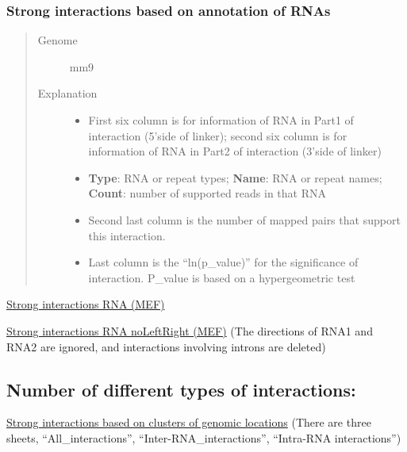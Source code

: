 \documentclass[letterpaper,10pt,english]{sphinxmanual}
\begin{document}
\subsubsection{Strong interactions based on annotation of RNAs}
\label{Data_Resources:id4}\begin{quote}\begin{description}
\item[{Genome}] \leavevmode
mm9

\item[{Explanation}] \leavevmode\begin{itemize}
\item {} 
First six column is for information of RNA in Part1 of interaction (5'side of linker); second six column is for information of RNA in Part2 of interaction (3'side of linker)

\item {} 
\textbf{Type}: RNA or repeat types; \textbf{Name}: RNA or repeat names; \textbf{Count}: number of supported reads in that RNA

\item {} 
Second last column is the number of mapped pairs that support this interaction.

\item {} 
Last column is the ``ln(p\_value)'' for the significance of interaction. P\_value is based on a hypergeometric test

\end{itemize}

\end{description}\end{quote}

\href{http://systemsbio.ucsd.edu/RNA-Hi-C/Data/GGCG\_MEF\_interaction\_clusters\_RNA.xlsx}{Strong interactions RNA (MEF)}

\href{http://systemsbio.ucsd.edu/RNA-Hi-C/Data/GGCG\_MEF\_interaction\_clusters\_RNA\_noLeftRight.xlsx}{Strong interactions RNA noLeftRight (MEF)} (The directions of RNA1 and RNA2 are ignored, and interactions involving introns are deleted)


\subsection{Number of different types of interactions:}
\label{Data_Resources:number-of-different-types-of-interactions}
\href{http://systemsbio.ucsd.edu/RNA-Hi-C/Data/Count\_types\_interaction\_fragment.htm}{Strong interactions based on clusters of genomic locations} (There are three sheets, ``All\_interactions'', ``Inter-RNA\_interactions'', ``Intra-RNA interactions'')
\end{document}
